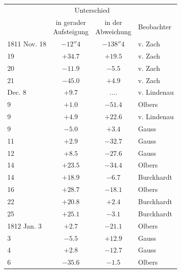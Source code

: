 \begin{center}
\fontsize{10}{12}\selectfont\setlength{\tabcolsep}{5pt}\renewcommand{\arraystretch}{1.15}\begin{tabular}{l|c|c|l}
 & \multicolumn{2}{c|}{Unterschied} & \\
 & \shortstack{in gerader\\Aufsteigung} & \shortstack{in der\\Abweichung} & Beobachter \\
\hline
1811 Nov. 18 & $-12''4$ & $-138''4$ & v. Zach \\
19 & $+34.7$ & $+19.5$ & v. Zach \\
20 & $-11.9$ & $-5.5$ & v. Zach \\
21 & $-45.0$ & $+4.9$ & v. Zach \\
Dec. 8 & $+9.7$ & .\;.\;.\;. & v. Lindenau \\
9 & $+1.0$ & $-51.4$ & Olbers \\
9 & $+4.9$ & $+22.6$ & v. Lindenau \\
9 & $-5.0$ & $+3.4$ & Gauss \\
11 & $+2.9$ & $-32.7$ & Gauss \\
12 & $+8.5$ & $-27.6$ & Gauss \\
14 & $+23.5$ & $-34.4$ & Olbers \\
14 & $+18.9$ & $-6.7$ & Burckhardt \\
16 & $+28.7$ & $-18.1$ & Olbers \\
22 & $+20.8$ & $+2.4$ & Burckhardt \\
25 & $+25.1$ & $-3.1$ & Burckhardt \\
1812 Jan. 3 & $+2.7$ & $-21.1$ & Olbers \\
3 & $-5.5$ & $+12.9$ & Gauss \\
4 & $+2.8$ & $-12.7$ & Gauss \\
6 & $-35.6$ & $-1.5$ & Olbers \\
\end{tabular}
\end{center}

